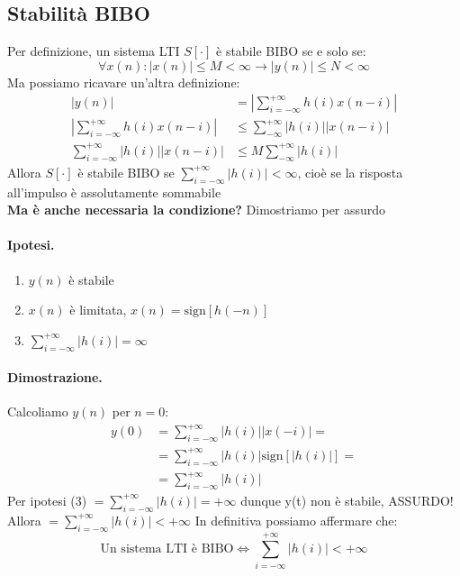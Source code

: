 \subsection{Stabilità BIBO}
Per definizione, un sistema LTI $S[\cdot]$ è stabile BIBO se e solo se:
\begin{equation}
    \forall x(n) : |x(n)| \leq M < \infty \longrightarrow |y(n)| \leq N < \infty
\end{equation}
Ma possiamo ricavare un'altra definizione:
\begin{align*}
    |y(n)| &= \left|\sum_{i=-\infty}^{+\infty}h(i)x(n-i)\right|\\
    \left|\sum_{i=-\infty}^{+\infty}h(i)x(n-i)\right| &\leq \sum_{-\infty}^{+\infty} |h(i)||x(n - i)|\\
    \sum_{i=-\infty}^{+\infty} |h(i)||x(n - i)| &\leq M \sum_{-\infty}^{+\infty} |h(i)|
\end{align*}
Allora $S[\cdot]$ è stabile BIBO se $\sum_{i=-\infty}^{+\infty} |h(i)| < \infty$, cioè se la risposta all'impulso è assolutamente sommabile\\
\textbf{Ma è anche necessaria la condizione?}
Dimostriamo per assurdo
\paragraph{Ipotesi.}
\begin{enumerate}
    \item $y(n)$ è stabile
    \item $x(n)$ è limitata, $x(n) = \mbox{sign}[h(-n)]$
    \item $\sum_{i=-\infty}^{+\infty} |h(i)| = \infty$ 
\end{enumerate}
\paragraph{Dimostrazione.}
Calcoliamo $y(n)$ per $n = 0$:
\begin{align*}
    y(0) &= \sum_{i=-\infty}^{+\infty} |h(i)||x( - i)| =\\
     &= \sum_{i=-\infty}^{+\infty} |h(i)|\mbox{sign}[|h(i)|] =\\
     &= \sum_{i=-\infty}^{+\infty} |h(i)|
\end{align*}
Per ipotesi (3) $= \sum_{i=-\infty}^{+\infty} |h(i)| = +\infty$ dunque y(t) non è stabile, ASSURDO! Allora $= \sum_{i=-\infty}^{+\infty} |h(i)| < +\infty$ 
In definitiva possiamo affermare che:
\begin{equation}
    \mbox{Un sistema LTI è BIBO} \Longleftrightarrow  \sum_{i=-\infty}^{+\infty} |h(i)| < +\infty
\end{equation}


